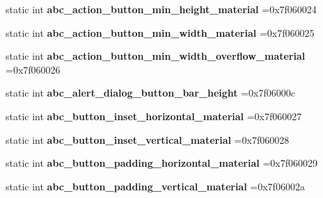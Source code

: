 \begin{DoxyCompactItemize}
static int {\bfseries abc\+\_\+action\+\_\+button\+\_\+min\+\_\+height\+\_\+material} =0x7f060024
\item 
\mbox{\label{classandroid_1_1support_1_1v7_1_1mediarouter_1_1R_1_1dimen_a3806237e84122d9c7339c5078facc2a2}} 
static int {\bfseries abc\+\_\+action\+\_\+button\+\_\+min\+\_\+width\+\_\+material} =0x7f060025
\item 
\mbox{\label{classandroid_1_1support_1_1v7_1_1mediarouter_1_1R_1_1dimen_afbf69b24b3128b6597af127b9ffc6528}} 
static int {\bfseries abc\+\_\+action\+\_\+button\+\_\+min\+\_\+width\+\_\+overflow\+\_\+material} =0x7f060026
\item 
\mbox{\label{classandroid_1_1support_1_1v7_1_1mediarouter_1_1R_1_1dimen_ade0d73acdc840676089759981723a0df}} 
static int {\bfseries abc\+\_\+alert\+\_\+dialog\+\_\+button\+\_\+bar\+\_\+height} =0x7f06000c
\item 
\mbox{\label{classandroid_1_1support_1_1v7_1_1mediarouter_1_1R_1_1dimen_a63e2637479974bf5f03ddd6c4bd7741c}} 
static int {\bfseries abc\+\_\+button\+\_\+inset\+\_\+horizontal\+\_\+material} =0x7f060027
\item 
\mbox{\label{classandroid_1_1support_1_1v7_1_1mediarouter_1_1R_1_1dimen_ad7bf9d65b322aa629ba6152c1c2624ec}} 
static int {\bfseries abc\+\_\+button\+\_\+inset\+\_\+vertical\+\_\+material} =0x7f060028
\item 
\mbox{\label{classandroid_1_1support_1_1v7_1_1mediarouter_1_1R_1_1dimen_a12a8a3192c57e12302ad68899e010f40}} 
static int {\bfseries abc\+\_\+button\+\_\+padding\+\_\+horizontal\+\_\+material} =0x7f060029
\item 
\mbox{\label{classandroid_1_1support_1_1v7_1_1mediarouter_1_1R_1_1dimen_adebf590e81e4a4eca03c38568d2759c8}} 
static int {\bfseries abc\+\_\+button\+\_\+padding\+\_\+vertical\+\_\+material} =0x7f06002a

\end{DoxyCompactItemize}
